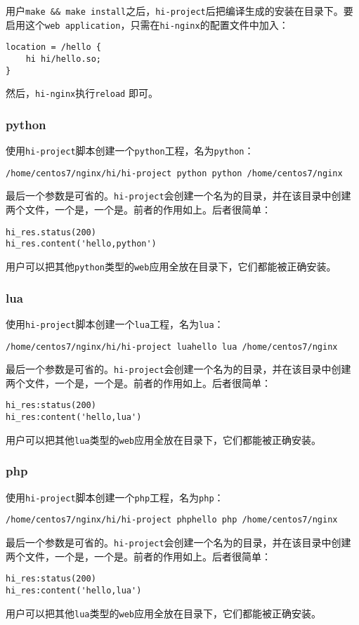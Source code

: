 用户\texttt{make \&\& make install}之后，\texttt{hi-project}后把编译生成的安装在目录下。要启用这个\texttt{web application}，只需在\texttt{hi-nginx}的配置文件中加入：
\begin{lstlisting}
location = /hello {
	hi hi/hello.so;
}
\end{lstlisting}
然后，\texttt{hi-nginx}执行\texttt{reload} 即可。


\subsubsection{python}
使用\texttt{hi-project}脚本创建一个\texttt{python}工程，名为\texttt{python}：
\begin{lstlisting}
/home/centos7/nginx/hi/hi-project python python /home/centos7/nginx
\end{lstlisting}
最后一个参数是可省的。\texttt{hi-project}会创建一个名为的目录，并在该目录中创建两个文件，一个是，一个是。前者的作用如上。后者很简单：
\begin{lstlisting}
hi_res.status(200)
hi_res.content('hello,python')
\end{lstlisting}
用户可以把其他\texttt{python}类型的\texttt{web}应用全放在目录下，它们都能被正确安装。

\subsubsection{lua}
使用\texttt{hi-project}脚本创建一个\texttt{lua}工程，名为\texttt{lua}：
\begin{lstlisting}
/home/centos7/nginx/hi/hi-project luahello lua /home/centos7/nginx
\end{lstlisting}
最后一个参数是可省的。\texttt{hi-project}会创建一个名为的目录，并在该目录中创建两个文件，一个是，一个是。前者的作用如上。后者很简单：
\begin{lstlisting}
hi_res:status(200)
hi_res:content('hello,lua')
\end{lstlisting}
用户可以把其他\texttt{lua}类型的\texttt{web}应用全放在目录下，它们都能被正确安装。

\subsubsection{php}
使用\texttt{hi-project}脚本创建一个\texttt{php}工程，名为\texttt{php}：
\begin{lstlisting}
/home/centos7/nginx/hi/hi-project phphello php /home/centos7/nginx
\end{lstlisting}
最后一个参数是可省的。\texttt{hi-project}会创建一个名为的目录，并在该目录中创建两个文件，一个是，一个是。前者的作用如上。后者很简单：
\begin{lstlisting}
hi_res:status(200)
hi_res:content('hello,lua')
\end{lstlisting}
用户可以把其他\texttt{lua}类型的\texttt{web}应用全放在目录下，它们都能被正确安装。


